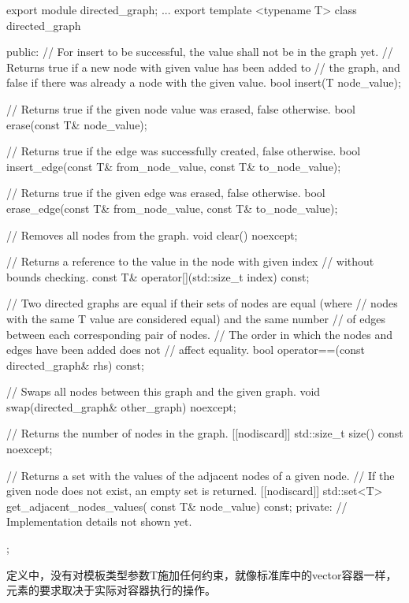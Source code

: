 \begin{cpp}
export module directed_graph;
...
export template <typename T>
class directed_graph
{
    public:
        // For insert to be successful, the value shall not be in the graph yet.
        // Returns true if a new node with given value has been added to
        // the graph, and false if there was already a node with the given value.
        bool insert(T node_value);

        // Returns true if the given node value was erased, false otherwise.
        bool erase(const T& node_value);

        // Returns true if the edge was successfully created, false otherwise.
        bool insert_edge(const T& from_node_value, const T& to_node_value);

        // Returns true if the given edge was erased, false otherwise.
        bool erase_edge(const T& from_node_value, const T& to_node_value);

        // Removes all nodes from the graph.
        void clear() noexcept;

        // Returns a reference to the value in the node with given index
        // without bounds checking.
        const T& operator[](std::size_t index) const;

        // Two directed graphs are equal if their sets of nodes are equal (where
        // nodes with the same T value are considered equal) and the same number
        // of edges between each corresponding pair of nodes.
        // The order in which the nodes and edges have been added does not
        // affect equality.
        bool operator==(const directed_graph& rhs) const;

        // Swaps all nodes between this graph and the given graph.
        void swap(directed_graph& other_graph) noexcept;

        // Returns the number of nodes in the graph.
        [[nodiscard]] std::size_t size() const noexcept;

        // Returns a set with the values of the adjacent nodes of a given node.
        // If the given node does not exist, an empty set is returned.
        [[nodiscard]] std::set<T> get_adjacent_nodes_values(
            const T& node_value) const;
    private:
        // Implementation details not shown yet.
};
\end{cpp}

定义中，没有对模板类型参数T施加任何约束，就像标准库中的vector容器一样，元素的要求取决于实际对容器执行的操作。

